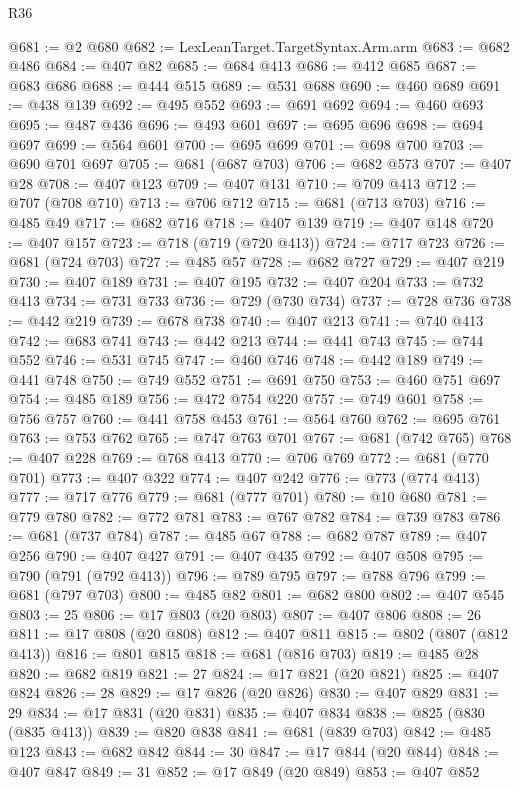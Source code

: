 \begin{lexlean}{R36}
\begin{coremodule}
{{{{{{{{{{{{{{{{{{{{{{{{{{{{{{{{{{{{{{{{{{{{{{{{{{{{{{{{{{{{{{{{{{{{{{{{{{{{{{{{{{@681 := @2 @680
@682 := LexLeanTarget.TargetSyntax.Arm.arm
@683 := @682 @486
@684 := @407 @82
@685 := @684 @413
@686 := @412 @685
@687 := @683 @686
@688 := @444 @515
@689 := @531 @688
@690 := @460 @689
@691 := @438 @139
@692 := @495 @552
@693 := @691 @692
@694 := @460 @693
@695 := @487 @436
@696 := @493 @601
@697 := @695 @696
@698 := @694 @697
@699 := @564 @601
@700 := @695 @699
@701 := @698 @700
@703 := @690 @701 @697
@705 := @681 (@687 @703)
@706 := @682 @573
@707 := @407 @28
@708 := @407 @123
@709 := @407 @131
@710 := @709 @413
@712 := @707 (@708 @710)
@713 := @706 @712
@715 := @681 (@713 @703)
@716 := @485 @49
@717 := @682 @716
@718 := @407 @139
@719 := @407 @148
@720 := @407 @157
@723 := @718 (@719 (@720 @413))
@724 := @717 @723
@726 := @681 (@724 @703)
@727 := @485 @57
@728 := @682 @727
@729 := @407 @219
@730 := @407 @189
@731 := @407 @195
@732 := @407 @204
@733 := @732 @413
@734 := @731 @733
@736 := @729 (@730 @734)
@737 := @728 @736
@738 := @442 @219
@739 := @678 @738
@740 := @407 @213
@741 := @740 @413
@742 := @683 @741
@743 := @442 @213
@744 := @441 @743
@745 := @744 @552
@746 := @531 @745
@747 := @460 @746
@748 := @442 @189
@749 := @441 @748
@750 := @749 @552
@751 := @691 @750
@753 := @460 @751 @697
@754 := @485 @189
@756 := @472 @754 @220
@757 := @749 @601
@758 := @756 @757
@760 := @441 @758 @453
@761 := @564 @760
@762 := @695 @761
@763 := @753 @762
@765 := @747 @763 @701
@767 := @681 (@742 @765)
@768 := @407 @228
@769 := @768 @413
@770 := @706 @769
@772 := @681 (@770 @701)
@773 := @407 @322
@774 := @407 @242
@776 := @773 (@774 @413)
@777 := @717 @776
@779 := @681 (@777 @701)
@780 := @10 @680
@781 := @779 @780
@782 := @772 @781
@783 := @767 @782
@784 := @739 @783
@786 := @681 (@737 @784)
@787 := @485 @67
@788 := @682 @787
@789 := @407 @256
@790 := @407 @427
@791 := @407 @435
@792 := @407 @508
@795 := @790 (@791 (@792 @413))
@796 := @789 @795
@797 := @788 @796
@799 := @681 (@797 @703)
@800 := @485 @82
@801 := @682 @800
@802 := @407 @545
@803 := 25
@806 := @17 @803 (@20 @803)
@807 := @407 @806
@808 := 26
@811 := @17 @808 (@20 @808)
@812 := @407 @811
@815 := @802 (@807 (@812 @413))
@816 := @801 @815
@818 := @681 (@816 @703)
@819 := @485 @28
@820 := @682 @819
@821 := 27
@824 := @17 @821 (@20 @821)
@825 := @407 @824
@826 := 28
@829 := @17 @826 (@20 @826)
@830 := @407 @829
@831 := 29
@834 := @17 @831 (@20 @831)
@835 := @407 @834
@838 := @825 (@830 (@835 @413))
@839 := @820 @838
@841 := @681 (@839 @703)
@842 := @485 @123
@843 := @682 @842
@844 := 30
@847 := @17 @844 (@20 @844)
@848 := @407 @847
@849 := 31
@852 := @17 @849 (@20 @849)
@853 := @407 @852
}}}}}}}}}}}}}}}}}}}}}}}}}}}}}}}}}}}}}}}}}}}}}}}}}}}}}}}}}}}}}}}}}}}}}}}}}}}}}}}}}}
\end{coremodule}
\end{lexlean}
